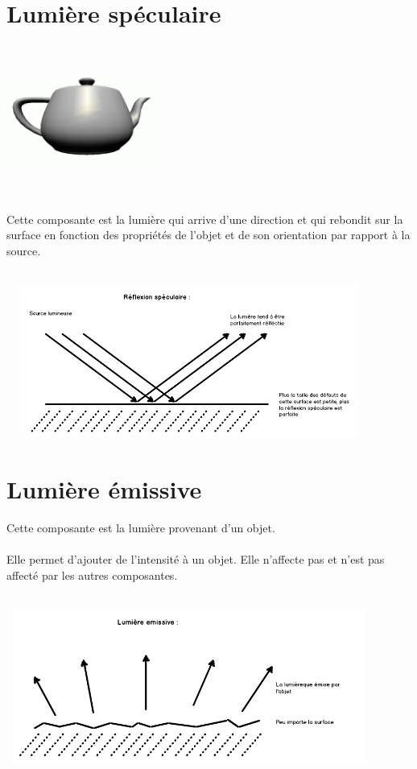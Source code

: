 \section{Lumière spéculaire}
\begin{center}
\includegraphics[width=5cm,height=5cm]{pipeline/images/objet_speculaire.png}
\end{center}
Cette composante est la lumière qui arrive d'une direction et qui rebondit sur la surface en fonction des propriétés de l'objet et de son orientation par rapport à la source.
\\\\
\begin{center}
\includegraphics[width=12cm,height=5cm]{pipeline/images/reflexion_speculaire.png}
\end{center}

\section{Lumière émissive}
Cette composante est la lumière provenant d'un objet.
\\\\
Elle permet d'ajouter de l'intensité à un objet.
Elle n'affecte pas et n'est pas affecté par les autres composantes.
\\\\
\begin{center}
\includegraphics[width=12cm,height=5cm]{pipeline/images/lumiere_emissive.png}
\end{center}